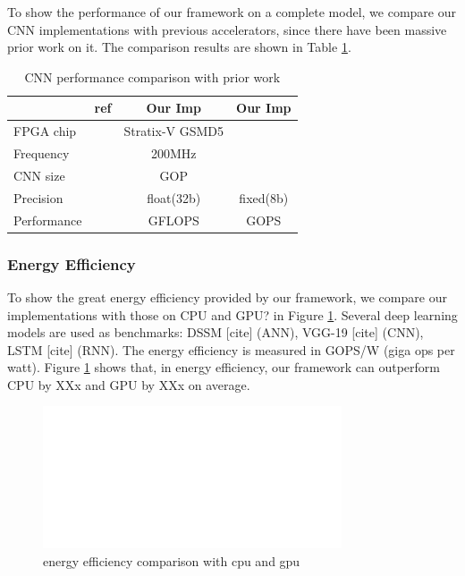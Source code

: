 \documentclass{acm_proc_article-sp-copy}
\begin{document}

To show the performance of our framework on a complete model, we compare our CNN implementations with previous accelerators, since there have been massive prior work on it. The comparison results are shown in Table \ref{cnn}.

\begin{table}[h]
	\centering
	\begin{tabular}{|l|c|c|c|}
		\hline
		 & ref & Our Imp & Our Imp \\
		\hline
		FPGA chip & & Stratix-V GSMD5& \\
		\hline
		Frequency & & 200MHz & \\
		\hline
		CNN size & & GOP & \\
		\hline
		Precision & & float(32b) & fixed(8b)\\
		\hline
		Performance & & GFLOPS & GOPS \\
		\hline
	\end{tabular}
	\caption{CNN performance comparison with prior work}
	\label{cnn}
\end{table}

\subsubsection{Energy Efficiency}
To show the great energy efficiency provided by our framework, we compare our implementations with those on CPU and GPU? in Figure \ref{ee}. Several deep learning models are used as benchmarks: DSSM [cite] (ANN), VGG-19 [cite] (CNN), LSTM [cite] (RNN). The energy efficiency is measured in GOPS/W (giga ops per watt). Figure \ref{ee} shows that, in energy efficiency, our framework can outperform CPU by XXx and GPU by XXx on average.  

\begin{figure}
	\centering
	\includegraphics[width=1.0\linewidth]{./figure/blank.jpg}
	\caption{energy efficiency comparison with cpu and gpu}
	\label{ee}
\end{figure}
\end{document}
